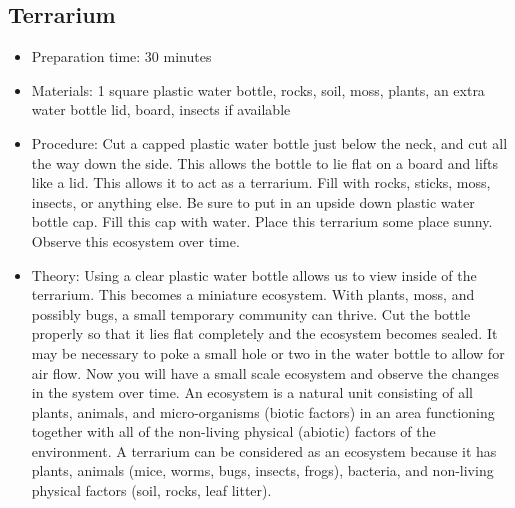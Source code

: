 \subsection{Terrarium}
\begin{itemize}
\item{Preparation time: 30 minutes}
\item{Materials: 1 square plastic water bottle, rocks, soil, moss, plants, an extra water bottle lid, board, insects if available}
\item{Procedure: Cut a capped plastic water bottle just below the neck, and cut all the way down the side. This allows the bottle to lie flat on a board and lifts like a lid. This allows it to act as a terrarium. Fill with rocks, sticks, moss, insects, or anything else. Be sure to put in an upside down plastic water bottle cap. Fill this cap with water. Place this terrarium some place sunny. Observe this ecosystem over time.}
\item{Theory: Using a clear plastic water bottle allows us to view inside of the terrarium. This becomes a miniature ecosystem. With plants, moss, and possibly bugs, a small temporary community can thrive. Cut the bottle properly so that it lies flat completely and the ecosystem becomes sealed. It may be necessary to poke a small hole or two in the water bottle to allow for air flow. Now you will have a small scale ecosystem and observe the changes in the system over time. An ecosystem is a natural unit consisting of all plants, animals, and micro-organisms (biotic factors) in an area functioning together with all of the non-living physical (abiotic) factors of the environment. A terrarium can be considered as an ecosystem because it has plants, animals (mice, worms, bugs, insects, frogs), bacteria, and non-living physical factors (soil, rocks, leaf litter).}
\end{itemize}

